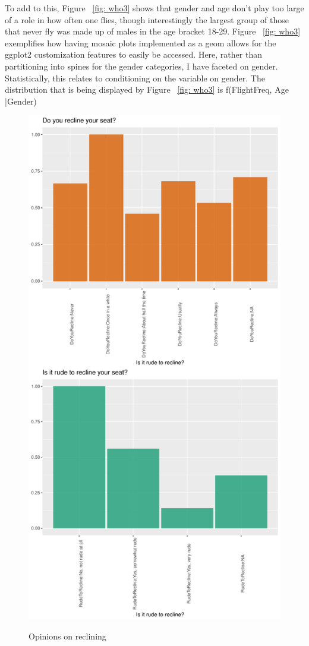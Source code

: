 \documentclass[DIV=calc, paper=a4, fontsize=10pt, twocolumn]{scrartcl}	 %
\begin{document}
\par  To add to this,  Figure ~\ref{fig: who3} shows that gender and age don't play too large of a role in how often one flies, though interestingly the largest group of those that never fly was made up of males in the age bracket 18-29.  Figure ~\ref{fig: who3} exemplifies how having mosaic plots implemented as a geom allows for the ggplot2 customization features to easily be accessed. Here, rather than partitioning into spines for the gender categories, I have faceted on gender. Statistically, this relates to conditioning on the variable on gender. The distribution that is being displayed by  Figure ~\ref{fig: who3} is f(FlightFreq, Age |Gender)




\begin{figure}[h!]
\caption{Opinions on reclining}
\centering
\includegraphics{flying-recline1}
\label{fig: recline1}
\end{figure}
\end{document}
